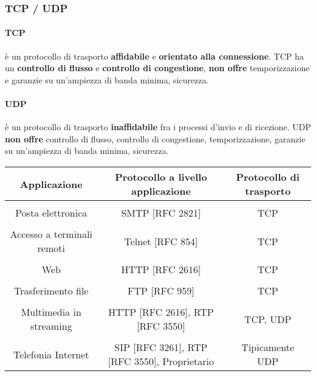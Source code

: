         \subsubsection{\Acrshort*{TCP} / \Acrshort*{UDP}}
            \paragraph{\acrfull*{TCP}} è un protocollo di trasporto \textbf{affidabile} e \textbf{orientato alla connessione}. \Acrshort*{TCP} ha un \textbf{controllo di flusso} e \textbf{controllo di congestione}, \textbf{non offre} temporizzazione e garanzie su un'ampiezza di banda minima, sicurezza.
            \paragraph{\acrfull*{UDP}} è un protocollo di trasporto \textbf{inaffidabile} fra i processi d'invio e di ricezione. \Acrshort*{UDP} \textbf{non offre} controllo di flusso, controllo di congestione, temporizzazione, garanzie su un'ampiezza di banda minima, sicurezza.
            
            \begin{table}[H]
                \centering
                \begin{adjustbox}{max width=\textwidth}
                    \begin{tabular}{c c c}
                        \textbf{Applicazione} & \textbf{Protocollo a livello applicazione} & \textbf{Protocollo di trasporto} \\
                        \hline \\
                        Posta elettronica & \Acrshort*{SMTP} [\Acrshort*{RFC} 2821] & \Acrshort*{TCP} \\
                        \hline \\
                        Accesso a terminali remoti & Telnet [\Acrshort*{RFC} 854] & \Acrshort*{TCP} \\
                        \hline \\
                        Web & \Acrshort*{HTTP} [\Acrshort*{RFC} 2616] & \Acrshort*{TCP} \\
                        \hline \\
                        Trasferimento file & \Acrshort*{FTP} [\Acrshort*{RFC} 959] & \Acrshort*{TCP} \\
                        \hline \\
                        Multimedia in streaming & \Acrshort*{HTTP} [\Acrshort*{RFC} 2616], {\Acrshort*{RTP}} [RFC 3550] & \Acrshort*{TCP}, \Acrshort*{UDP} \\
                        \hline \\
                        Telefonia Internet & \Acrshort*{SIP} [\Acrshort*{RFC} 3261], \Acrshort*{RTP} [RFC 3550], Proprietario & Tipicamente \Acrshort*{UDP} \\  
                        \hline
                    \end{tabular}
                \end{adjustbox}
            \end{table}
